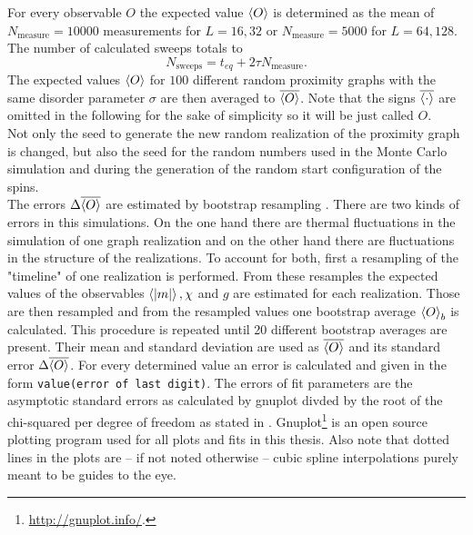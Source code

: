     For every observable \(O\) the expected value \(\left< O \right>\) is determined
    as the mean of \(N_{\mathrm{measure}}=10000\) measurements for \(L=16,32\)
    or \(N_{\mathrm{measure}}=5000\) for \(L=64,128\). The number of
    calculated sweeps totals to
    \[N_{\mathrm{sweeps}}=t_{eq}+2\tau N_{\mathrm{measure}}.\]
    The expected values \(\left< O \right>\) for \(100\) different random proximity
    graphs with the same disorder parameter \(\sigma\) are then averaged to
    \(\overline{\left< O \right>}\). Note that the signs \(\overline{\left< \cdot \right>}\)
    are omitted in the following for the sake of simplicity so
    it will be just called \(O\).\\
    Not only the seed to generate the new random
    realization of the proximity graph is changed, but also the seed for
    the random numbers used in the Monte Carlo simulation and during the
    generation of the random start configuration of the spins.\\
    The errors \(\Delta \overline{\left< O \right>}\) are estimated by bootstrap resampling
    \cite{Bootstrap}.
    There are two kinds of errors in this simulations. On the one hand
    there are thermal fluctuations in the simulation of one graph realization and
    on the other hand there are fluctuations in the structure of the realizations.
    To account for both, first a resampling of the "timeline" of one
    realization is performed. From these resamples the expected values of
    the observables \(\left< \left\vert m\right\vert \right>, \chi\) and \(g\) are estimated for each
    realization. Those are then resampled and from the resampled values
    one bootstrap average \(\left< O \right>_b\) is calculated. This procedure is
    repeated until 20 different bootstrap averages are present. Their
    mean and standard deviation are used as \(\overline{\left< O \right>}\) and
    its standard error \(\Delta \overline{\left< O \right>}\).
    For every determined value an
    error is calculated and given in the form \texttt{value(error of last digit)}.
    The errors of fit parameters are the asymptotic standard errors as calculated
    by gnuplot divded by the root of the chi-squared per degree of freedom
    as stated in \cite{young2012everything}. Gnuplot\footnote{\url{http://gnuplot.info/}.} is an open
    source plotting program used for all plots and fits in this thesis.
    Also note that dotted lines in the plots are -- if not noted otherwise --
    cubic spline interpolations purely meant to be guides to the eye.

